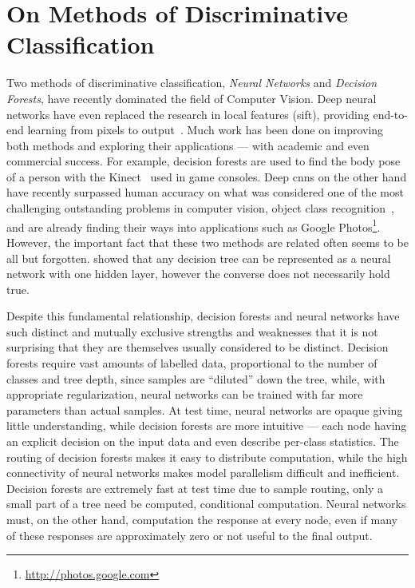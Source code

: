 \documentclass[thesis]{subfiles}
\begin{document}
	\section{On Methods of Discriminative Classification}
	Two methods of discriminative classification, \emph{Neural Networks} and \emph{Decision Forests}, have recently dominated the field of Computer Vision. Deep neural networks have even replaced the research in local features (\eg \gls{sift}), providing end-to-end learning from pixels to output~\citep{yi2016lift}. Much work has been done on improving both methods and exploring their applications --- with academic and even commercial success. For example, decision forests are used to find the body pose of a person with the Kinect~\citep{conf/cvpr/ShottonFCSFMKB11} used in game consoles. Deep \glspl{cnn} on the other hand have recently surpassed human accuracy on what was considered one of the most challenging outstanding problems in computer vision, object class recognition~\citep{He2015b}, and are already finding their ways into applications such as Google Photos\footnote{\href{http://photos.google.com}{http://photos.google.com}}. However, the important fact that these two methods are related often seems to be all but forgotten. \citet{Sethi1990} showed that any decision tree can be represented as a neural network with one hidden layer, however the converse does not necessarily hold true.
	
	Despite this fundamental relationship, decision forests and neural networks have such distinct and mutually exclusive strengths and weaknesses that it is not surprising that they are themselves usually considered to be distinct. Decision forests require vast amounts of labelled data, proportional to the number of classes and tree depth, since samples are ``diluted'' down the tree, while, with appropriate regularization, neural networks can be trained with far more parameters than actual samples. At test time, neural networks are opaque giving little understanding, while decision forests are more intuitive --- each node having an explicit decision on the input data and even describe per-class statistics. The routing of decision forests makes it easy to distribute computation, while the high connectivity of neural networks makes model parallelism difficult and inefficient. Decision forests are extremely fast at test time due to sample routing, only a small part of a tree need be computed, \ie conditional computation. Neural networks must, on the other hand, computation the response at every node, even if many of these responses are approximately zero or not useful to the final output.
	
\end{document}
